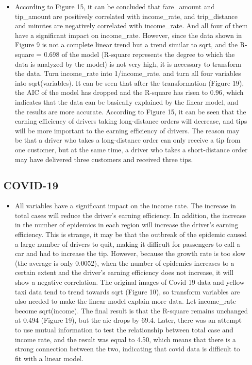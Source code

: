 \documentclass[11pt]{article}
\begin{document}
\begin{itemize}
    \item According to Figure 15, it can be concluded that fare\_amount and tip\_amount are positively correlated with income\_rate, and trip\_distance and minutes are negatively correlated with income\_rate. And all four of them have a significant impact on income\_rate. However, since the data shown in Figure 9 is not a complete linear trend but a trend similar to sqrt, and the R-square = 0.698 of the model (R-square represents the degree to which the data is analyzed by the model) is not very high, it is necessary to transform the data. Turn income\_rate into 1/income\_rate, and turn all four variables into sqrt(variables). It can be seen that after the transformation (Figure 19), the AIC of the model has dropped and the R-square has risen to 0.96, which indicates that the data can be basically explained by the linear model, and the results are more accurate. According to Figure 15, it can be seen that the earning efficiency of drivers taking long-distance orders will decrease, and tips will be more important to the earning efficiency of drivers. The reason may be that a driver who takes a long-distance order can only receive a tip from one customer, but at the same time, a driver who takes a short-distance order may have delivered three customers and received three tips.
\end{itemize}
\subsection{COVID-19}
\begin{itemize}
    \item All variables have a significant impact on the income rate. The increase in total cases will reduce the driver's earning efficiency. In addition, the increase in the number of epidemics in each region will increase the driver's earning efficiency. This is strange, it may be that the outbreak of the epidemic caused a large number of drivers to quit, making it difficult for passengers to call a car and had to increase the tip. However, because the growth rate is too slow (the average is only 0.0052), when the number of epidemics increases to a certain extent and the driver's earning efficiency does not increase, it will show a negative correlation. The original images of Covid-19 data and yellow taxi data tend to trend towards sqrt (Figure 10), so transform variables are also needed to make the linear model explain more data. Let income\_rate become sqrt(income). The final result is that the R-square remains unchanged at 0.494 (Figure 19), but the aic drops by 69.4. Later, there was an attempt to use mutual information to test the relationship between total case and income rate, and the result was equal to 4.50, which means that there is a strong connection between the two, indicating that covid data is difficult to fit with a linear model.
\end{itemize}
\end{document}
